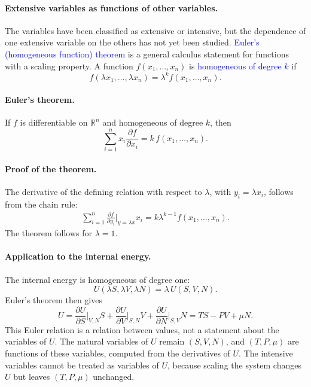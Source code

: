 \paragraph{Extensive variables as functions of other variables.}
The variables have been classified as extensive or intensive, but the
dependence of one extensive variable on the others has not yet been studied.
\textcolor{blue}{Euler's (homogeneous function) theorem} is a general
calculus statement for functions with a scaling property. A function
$f(x_1,\ldots,x_n)$ is \textcolor{blue}{homogeneous of degree $k$} if
\begin{equation}
    \boxed{f(\lambda x_1,\ldots,\lambda x_n)=\lambda^k f(x_1,\ldots,x_n).}
\end{equation}

\paragraph{Euler's theorem.}
If $f$ is differentiable on $\mathbb{R}^n$ and homogeneous of degree $k$, then
\begin{equation}
    \boxed{\sum_{i=1}^n x_i\frac{\partial f}{\partial x_i}=k\,f(x_1,\ldots,x_n).}
\end{equation}

\paragraph{Proof of the theorem.}
The derivative of the defining relation with respect to $\lambda$, with
$y_i=\lambda x_i$, follows from the chain rule:
\begin{align*}
    \sum_{i=1}^n\frac{\partial f}{\partial y_i}\bigg|_{y=\lambda x}x_i
    =k\lambda^{k-1}f(x_1,\ldots,x_n).
\end{align*}
The theorem follows for $\lambda=1$.

\paragraph{Application to the internal energy.}
The internal energy is homogeneous of degree one:
\begin{equation*}
    U(\lambda S,\lambda V,\lambda N)=\lambda\,U(S,V,N).
\end{equation*}
Euler's theorem then gives
\begin{equation}
    \boxed{U=\frac{\partial U}{\partial S}\bigg|_{V,N}S
    +\frac{\partial U}{\partial V}\bigg|_{S,N}V
    +\frac{\partial U}{\partial N}\bigg|_{S,V}N=TS-PV+\mu N.}
\end{equation}
This Euler relation is a relation between values, not a statement about the
variables of $U$. The natural variables of $U$ remain $(S,V,N)$, and
$(T,P,\mu)$ are functions of these variables, computed from the derivatives
of $U$. The intensive variables cannot be treated as variables of $U$,
because scaling the system changes $U$ but leaves $(T,P,\mu)$ unchanged.

